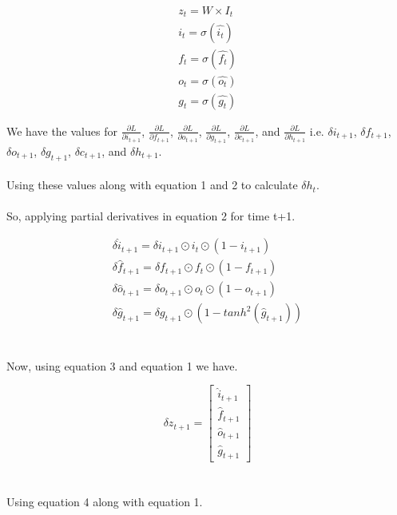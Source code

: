 \begin{equation}
  \begin{gathered}
    z_t = W \times I_t\\        
    i_t = \sigma(\hat{i_t})\\
    f_t = \sigma(\hat{f_t})\\
    o_t = \sigma(\hat{o_t})\\
    g_t = \sigma(\hat{g_t})
   \end{gathered}
\end{equation}  

We have the values for $\frac{\partial L}{\partial i_{t+1}}$, $\frac{\partial L}{\partial f_{t+1}}$, $\frac{\partial L}{\partial o_{t+1}}$, $\frac{\partial L}{\partial g_{t+1}}$, $\frac{\partial L}{\partial c_{t+1}}$, and $\frac{\partial L}{\partial h_{t+1}} $ i.e. $ \delta i_{t+1} $, $ \delta f_{t+1} $, $ \delta o_{t+1} $, $ \delta g_{t+1} $, $ \delta c_{t+1} $, and $ \delta h_{t+1} $. 
\\ \\ 
Using these values along with equation 1 and 2 to calculate $ \delta h_t $. 
\\ \\
So, applying partial derivatives in equation 2 for time t+1.

\begin{equation}
\begin{gathered}
    \delta \hat{i}_{t+1} = \delta i_{t+1} \odot i_t \odot (1 - i_{t+1})\\
    \delta \hat{f}_{t+1} = \delta f_{t+1} \odot f_t \odot (1 - f_{t+1})\\
    \delta \hat{o}_{t+1} = \delta o_{t+1} \odot o_t \odot (1 - o_{t+1})\\
    \delta \hat{g}_{t+1} = \delta g_{t+1} \odot (1 - tanh^{2}(\hat{g}_{t+1}))
\end{gathered}
\end{equation}
\\ \\ 

Now, using equation 3 and equation 1 we have. 

\begin{equation}
 \delta z_{t+1} = \begin{bmatrix} \hat{i}_{t+1} \\ \hat{f}_{t+1} \\ \hat{o}_{t+1} \\ \hat{g}_{t+1} \end{bmatrix}
\end{equation}
\\ \\ 
Using 
equation 4 along with equation 1. 
\\ \\ 

